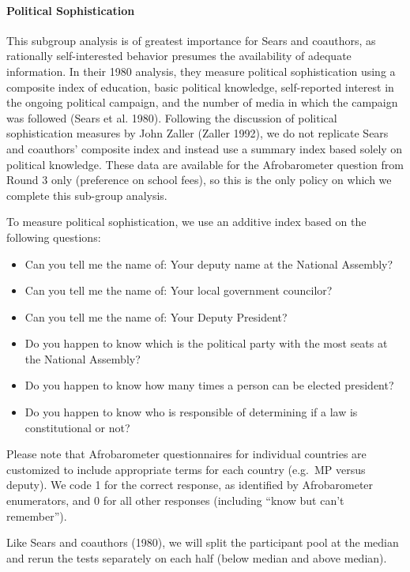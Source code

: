 \documentclass[]{article}
\let\oldparagraph\paragraph
\renewcommand{\paragraph}[1]{\oldparagraph{#1}\mbox{}}
\begin{document}
\paragraph{Political Sophistication}\label{political-sophistication}

This subgroup analysis is of greatest importance for Sears and
coauthors, as rationally self-interested behavior presumes the
availability of adequate information. In their 1980 analysis, they
measure political sophistication using a composite index of education,
basic political knowledge, self-reported interest in the ongoing
political campaign, and the number of media in which the campaign was
followed (Sears et al. 1980). Following the discussion of political
sophistication measures by John Zaller (Zaller 1992), we do not
replicate Sears and coauthors' composite index and instead use a summary
index based solely on political knowledge. These data are available for
the Afrobarometer question from Round 3 only (preference on school
fees), so this is the only policy on which we complete this sub-group
analysis.

To measure political sophistication, we use an additive index based on
the following questions:

\begin{itemize}
  \item Can you tell me the name of: Your deputy name at the National Assembly?
  \item Can you tell me the name of: Your local government councilor?
  \item Can you tell me the name of: Your Deputy President?
  \item Do you happen to know which is the political party with the most seats at the National Assembly?
  \item Do you happen to know how many times a person can be elected president?
  \item Do you happen to know who is responsible of determining if a law is constitutional or not?
\end{itemize}

Please note that Afrobarometer questionnaires for individual countries
are customized to include appropriate terms for each country (e.g.~MP
versus deputy). We code 1 for the correct response, as identified by
Afrobarometer enumerators, and 0 for all other responses (including
``know but can't remember'').

Like Sears and coauthors (1980), we will split the participant pool at
the median and rerun the tests separately on each half (below median and
above median).
\end{document}
